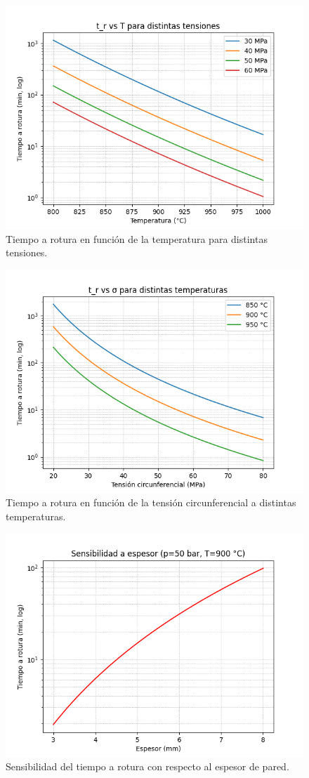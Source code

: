 \documentclass[12pt,a4paper]{article}
\begin{document}
\begin{figure}[H]
    \centering
    \includegraphics[width=0.7\linewidth]{tr_vs_T.png}
    \caption{Tiempo a rotura en función de la temperatura para distintas tensiones.}
\end{figure}

\begin{figure}[H]
    \centering
    \includegraphics[width=0.7\linewidth]{tr_vs_sigma.png}
    \caption{Tiempo a rotura en función de la tensión circunferencial a distintas temperaturas.}
\end{figure}

\begin{figure}[H]
    \centering
    \includegraphics[width=0.7\linewidth]{sens_espesor.png}
    \caption{Sensibilidad del tiempo a rotura con respecto al espesor de pared.}
\end{figure}
\end{document}
